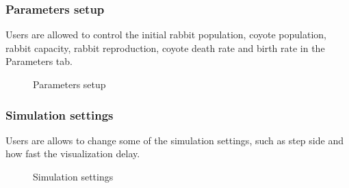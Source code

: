 \documentclass{article}
\begin{document}
\begin{normalsize}
\newpage
\subsubsection{Parameters setup}
Users are allowed to control the initial rabbit population, coyote population, rabbit capacity, rabbit reproduction, coyote death rate and birth rate in the Parameters tab.
\begin{figure}[H]
	\caption{Parameters setup}
\end{figure}

\subsubsection{Simulation settings}
Users are allows to change some of the simulation settings, such as step side and how fast the visualization delay.
\begin{figure}[H]
	\caption{Simulation settings}
\end{figure}


\end{normalsize}
\end{document}
